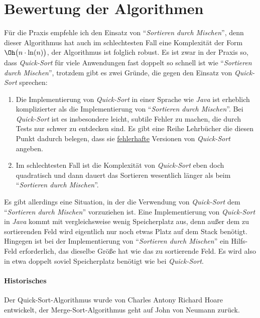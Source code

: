 \section{Bewertung der Algorithmen}
F\"ur die Praxis empfehle ich den Einsatz von ``\emph{Sortieren durch Mischen}'', denn dieser Algorithmus hat auch im schlechtesten Fall 
eine Komplexit\"at der Form $\Oh\bigl(n\cdot \ln(n)\bigr)$, der Algorithmus ist folglich robust.
Es ist zwar in der Praxis so, dass \emph{Quick-Sort} f\"ur viele Anwendungen fast doppelt   
so schnell ist wie ``\emph{Sortieren durch Mischen}'', trotzdem gibt es zwei Gr\"unde, die gegen den Einsatz von
\emph{Quick-Sort} sprechen:
\begin{enumerate}
\item Die Implementierung von \emph{Quick-Sort} in einer Sprache wie \textsl{Java} ist erheblich komplizierter als 
      die Implementierung von ``\emph{Sortieren durch Mischen}''.
      Bei \emph{Quick-Sort} ist es insbesondere leicht, subtile Fehler zu machen, die durch Tests nur schwer 
      zu entdecken sind.  Es gibt eine Reihe Lehrb\"ucher die diesen Punkt dadurch belegen, dass sie
      \underline{fehlerhafte} Versionen von \emph{Quick-Sort} angeben.
\item Im schlechtesten Fall ist die Komplexit\"at von \emph{Quick-Sort} eben doch quadratisch und dann dauert das
      Sortieren wesentlich l\"anger als beim ``\emph{Sortieren durch Mischen}''.
\end{enumerate}
Es gibt allerdings eine Situation, in der die Verwendung von \emph{Quick-Sort} dem ``\emph{Sortieren durch Mischen}'' 
vorzuziehen ist.  Eine Implementierung von \emph{Quick-Sort} in \textsl{Java} kommt mit vergleichsweise wenig Speicherplatz aus,
denn au\ss{}er dem zu sortierenden Feld wird eigentlich nur noch etwas Platz auf dem Stack ben\"otigt.  Hingegen
ist bei der Implementierung von ``\emph{Sortieren durch Mischen}'' ein Hilfs-Feld erforderlich, das dieselbe Gr\"o\ss{}e hat
wie das zu sortierende Feld.  Es wird also in etwa doppelt soviel Speicherplatz ben\"otigt wie bei 
\emph{Quick-Sort}.

\paragraph{Historisches}  
Der Quick-Sort-Algorithmus wurde von Charles Antony Richard Hoare \cite{hoare:61}
entwickelt, der Merge-Sort-Algorithmus geht auf John von Neumann zur\"uck.

